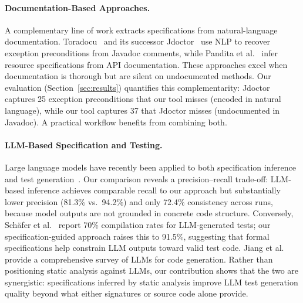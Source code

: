 \paragraph{Documentation-Based Approaches.}
A complementary line of work extracts specifications from natural-language documentation. Toradocu~\cite{toradocu2016} and its successor Jdoctor~\cite{jdoctor2018} use NLP to recover exception preconditions from Javadoc comments, while Pandita et al.~\cite{pandita2012inferring} infer resource specifications from API documentation. These approaches excel when documentation is thorough but are silent on undocumented methods. Our evaluation (Section~\ref{sec:results}) quantifies this complementarity: Jdoctor captures 25 exception preconditions that our tool misses (encoded in natural language), while our tool captures 37 that Jdoctor misses (undocumented in Javadoc). A practical workflow benefits from combining both.

\paragraph{LLM-Based Specification and Testing.}
Large language models have recently been applied to both specification inference~\cite{ma2024specgen, endres2024can} and test generation~\cite{chen2022codet, schafer2023adaptive, chen2021codex, deng2023large, yuan2024chatunitest, lemieux2023codamosa}. Our comparison reveals a precision--recall trade-off: LLM-based inference achieves comparable recall to our approach but substantially lower precision (81.3\% vs.\ 94.2\%) and only 72.4\% consistency across runs, because model outputs are not grounded in concrete code structure. Conversely, Sch\"{a}fer et al.~\cite{schafer2023adaptive} report 70\% compilation rates for LLM-generated tests; our specification-guided approach raises this to 91.5\%, suggesting that formal specifications help constrain LLM outputs toward valid test code. Jiang et al.~\cite{jiang2024survey} provide a comprehensive survey of LLMs for code generation. Rather than positioning static analysis against LLMs, our contribution shows that the two are synergistic: specifications inferred by static analysis improve LLM test generation quality beyond what either signatures or source code alone provide.

